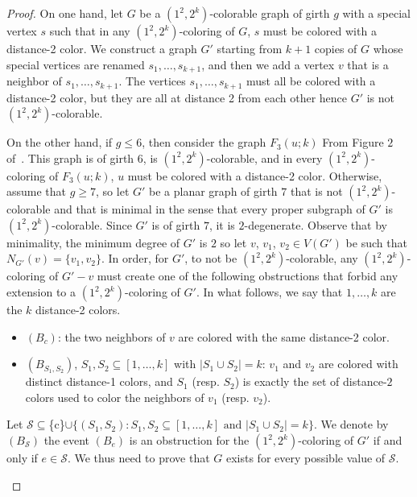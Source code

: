 \documentclass{article}
\newcommand{\colo}[2]{(1^{#1}, 2^{#2})}
\begin{document}
\begin{proof}
    On one hand, let $G$ be a $\colo{2}{k}$-colorable graph of girth $g$ with a special vertex $s$ such that in any $\colo{2}{k}$-coloring of $G$, $s$ must be colored with a distance-2 color. We construct a graph $G'$ starting from $k + 1$ copies of $G$ whose special vertices are renamed $s_1, \dots, s_{k + 1}$, and then we add a vertex $v$ that is a neighbor of $s_1, \dots, s_{k + 1}$. The vertices $s_1, \dots, s_{k + 1}$ must all be colored with a distance-2 color, but they are all at distance 2 from each other hence $G'$ is not $\colo{2}{k}$-colorable. 

    On the other hand, if $g \leq 6$, then consider the graph $F_3(u; k)$ From Figure $2$ of~\cite{choi2025propersquarecoloringssparse}. This graph is of girth $6$, is $\colo{2}{k}$-colorable, and in every $\colo{2}{k}$-coloring of $F_3(u; k)$, $u$ must be colored with a distance-2 color. Otherwise, assume that $g \geq 7$, so let $G'$ be a planar graph of girth $7$ that is not $\colo{2}{k}$-colorable and that is minimal in the sense that every proper subgraph of $G'$ is $\colo{2}{k}$-colorable. Since $G'$ is of girth $7$, it is $2$-degenerate. Observe that by minimality, the minimum degree of $G'$ is $2$ so let $v$, $v_1$, $v_2 \in V(G')$ be such that $N_{G'}(v) = \{v_1, v_2\}$.
    In order, for $G'$, to not be $\colo{2}{k}$-colorable, any $\colo{2}{k}$-coloring of $G' - v$ must create one of the following obstructions that forbid any extension to a $\colo{2}{k}$-coloring of $G'$. In what follows, we say that $1, \dots, k$ are the $k$ distance-2 colors.
    \begin{itemize}
        \item $(B_c)$: the two neighbors of $v$ are colored with the same distance-2 color.
        \item $(B_{S_1, S_2})$, $S_1, S_2 \subseteq[1,\dots,k]$ with $|S_1 \cup S_2| = k$: 
        $v_1$ and $v_2$ are colored with distinct distance-1 colors, and $S_1$ (resp. $S_2$) is exactly the set of distance-$2$ colors used to color the neighbors of $v_1$ (resp. $v_2$). 
    \end{itemize}
    Let $\mathcal{S} \subseteq $\{c\}$ \cup \{(S_1, S_2) : S_1, S_2\subseteq[1,\dots,k] \textrm{ and } |S_1 \cup S_2| = k\}$. We denote by $(B_\mathcal{S})$ the event $(B_e)$ is an obstruction for the $\colo{2}{k}$-coloring of $G'$ if and only if $e \in \mathcal{S}$. We thus need to prove that $G$ exists for every possible value of $\mathcal{S}$.
    \begin{itemize}

\end{itemize}
\end{proof}
\end{document}
